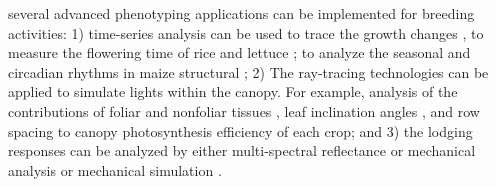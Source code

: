 several advanced phenotyping applications can be implemented for breeding activities: 1) time-series analysis can be used to trace the growth changes \citep{li_analyzing_2013}, to measure the flowering time of rice \citep{guo_automated_2015} and lettuce \citep{han_drone_2021}; to analyze the seasonal and circadian rhythms in maize structural \citep{jin_exploring_2021}; 2) The ray-tracing technologies can be applied to simulate lights within the canopy. For example, analysis of the contributions of foliar and nonfoliar tissues \citep{chang_3dcap_2022}, leaf inclination angles \citep{liu_canopy_2021}, and row spacing \citep{he_modeling_2021} to canopy photosynthesis efficiency of each crop; and 3) the lodging responses can be analyzed by either multi-spectral reflectance \citep{wang_detection_2021, wang_classification_2021} or mechanical analysis \citep{cook_darling_2019, robertson_maize_2017} or mechanical simulation \citep{nakashima_non-destructive_2023}.


